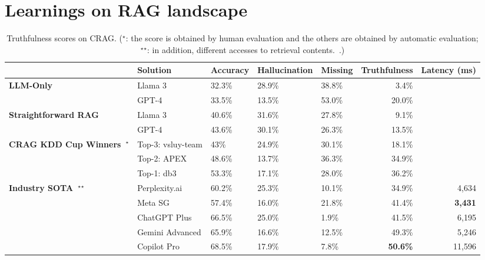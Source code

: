 \section{Learnings on RAG landscape}
\label{sec:raglandscape}


\begin{table}[htbp]
\centering
\scriptsize
\begin{tabular}{lllllrr}
\toprule
& \bf Solution & \bf Accuracy & \bf Hallucination & \bf Missing & \bf Truthfulness & \bf Latency (ms) \\
\midrule
\bf LLM-Only & Llama 3 & 32.3\% & 28.9\% & 38.8\% & 3.4\% & \\
         & GPT-4 & 33.5\% & 13.5\% & 53.0\% & 20.0\% & \\
\midrule
\bf Straightforward RAG & Llama 3 & 40.6\% & 31.6\% & 27.8\% & 9.1\% & \\
         & GPT-4 & 43.6\% & 30.1\% & 26.3\% & 13.5\% & \\
\midrule
\bf CRAG KDD Cup Winners~$^\star$ 
         & Top-3: vsluy-team & 43\% & 24.9\% & 30.1\% & 18.1\% & \\
         & Top-2: APEX & 48.6\% & 13.7\% & 36.3\% & 34.9\% & \\ 
         & Top-1: db3 & 53.3\% & 17.1\% & 28.0\% & 36.2\% & \\ 
\midrule
\bf Industry SOTA~${}^\star {}^\star$ 
         & Perplexity.ai & 60.2\% & 25.3\% & 10.1\% & 34.9\% & 4,634\\
         & Meta SG & 57.4\% & 16.0\% & 21.8\% & 41.4\% & \bf 3,431 \\
         & ChatGPT Plus & 66.5\% & 25.0\% & 1.9\% & 41.5\% & 6,195\\
         & Gemini Advanced & 65.9\% & 16.6\% & 12.5\% & 49.3\% & 5,246\\
         & Copilot Pro & 68.5\% & 17.9\% & 7.8\% & \bf 50.6\% & 11,596\\
\bottomrule
\end{tabular}
\caption{Truthfulness scores on CRAG. ($^\star$: the score is obtained by human evaluation and the others are obtained by automatic evaluation; ${}^\star {}^\star$:
in addition, different accesses to retrieval contents.~\cite{yang2024crag}.)}
\label{tab:raglandscape}
\end{table}



